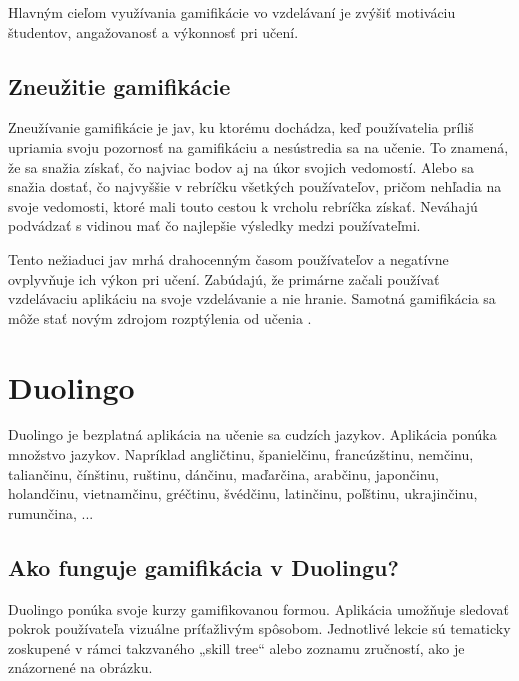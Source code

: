 \documentclass[10pt,twoside,slovak,a4paper]{article}
\begin{document}
Hlavným cieľom využívania gamifikácie vo vzdelávaní je zvýšiť motiváciu študentov, angažovanosť a výkonnosť pri učení\cite{HadiMogavi2022}. 

\subsection{Zneužitie gamifikácie} \label{Čo je to gamifikácia?:Zneužitie gamifikácie}

Zneužívanie gamifikácie je jav, ku ktorému dochádza, keď používatelia príliš upriamia svoju pozornosť na gamifikáciu a nesústredia sa na učenie\cite{HadiMogavi2022}. To znamená, že sa snažia získať, čo najviac bodov aj na úkor svojich vedomostí. Alebo sa snažia dostať, čo najvyššie v rebríčku všetkých používateľov, pričom nehľadia na svoje vedomosti, ktoré mali touto cestou k vrcholu rebríčka získať. Neváhajú podvádzať s vidinou mať čo najlepšie výsledky medzi používateľmi.

Tento nežiaduci jav mrhá drahocenným časom používateľov a negatívne ovplyvňuje ich výkon pri učení\cite{HadiMogavi2022}. Zabúdajú, že primárne začali používať vzdelávaciu aplikáciu na svoje vzdelávanie a nie hranie. Samotná gamifikácia sa môže stať novým zdrojom rozptýlenia od učenia \cite{negativegamification}.

%

\section{Duolingo} \label{Duolingo}
Duolingo je bezplatná aplikácia na učenie sa cudzích jazykov. Aplikácia ponúka množstvo jazykov. Napríklad angličtinu, španielčinu, francúzštinu, nemčinu, taliančinu, čínštinu, ruštinu, dánčinu, maďarčina, arabčinu, japončinu, holandčinu, vietnamčinu, gréčtinu, švédčinu, latinčinu, poľštinu, ukrajinčinu, rumunčina, ...\cite{Duoplanet}  

\subsection{Ako funguje gamifikácia v Duolingu?} \label{Duolingo:Ako funguje gamifikácia v Duolingu?}
Duolingo ponúka svoje kurzy gamifikovanou formou. Aplikácia umožňuje sledovať pokrok používateľa vizuálne príťažlivým spôsobom\cite{HadiMogavi2022}. Jednotlivé lekcie sú tematicky zoskupené v rámci takzvaného „skill tree“ alebo zoznamu zručností, ako je znázornené na obrázku. \cite{Duolingo} %
\end{document}

